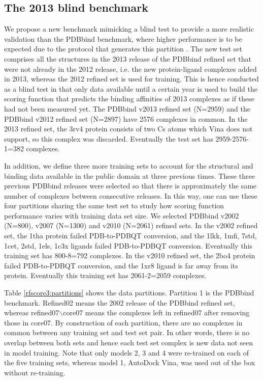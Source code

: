 \subsection{The 2013 blind benchmark}

We propose a new benchmark mimicking a blind test to provide a more realistic validation than the PDBbind benchmark, where higher performance is to be expected due to the protocol that generates this partition \citep{908}. The new test set comprises all the structures in the 2013 release of the PDBbind refined set that were not already in the 2012 release, i.e. the new protein-ligand complexes added in 2013, whereas the 2012 refined set is used for training. This is hence conducted as a blind test in that only data available until a certain year is used to build the scoring function that predicts the binding affinities of 2013 complexes as if these had not been measured yet. The PDBbind v2013 refined set (N=2959) and the PDBbind v2012 refined set (N=2897) have 2576 complexes in common. In the 2013 refined set, the 3rv4 protein consists of two Cs atoms which Vina does not support, so this complex was discarded. Eventually the test set has 2959-2576-1=382 complexes.

In addition, we define three more training sets to account for the structural and binding data available in the public domain at three previous times. These three previous PDBbind releases were selected so that there is approximately the same number of complexes between consecutive releases. In this way, one can use these four partitions sharing the same test set to study how scoring function performance varies with training data set size. We selected PDBbind v2002 (N=800), v2007 (N=1300) and v2010 (N=2061) refined sets. In the v2002 refined set, the 1tha protein failed PDB-to-PDBQT conversion, and the 1lkk, 1mfi, 7std, 1cet, 2std, 1els, 1c3x ligands failed PDB-to-PDBQT conversion. Eventually this training set has 800-8=792 complexes. In the v2010 refined set, the 2bo4 protein failed PDB-to-PDBQT conversion, and the 1xr8 ligand is far away from its protein. Eventually this training set has 2061-2=2059 complexes.

Table \ref{rfscore3:partitions} shows the data partitions. Partition 1 is the PDBbind benchmark. Refined02 means the 2002 release of the PDBbind refined set, whereas refined07$\backslash$core07 means the complexes left in refined07 after removing those in core07. By construction of each partition, there are no complexes in common between any training set and test set pair. In other words, there is no overlap between both sets and hence each test set complex is new data not seen in model training. Note that only models 2, 3 and 4 were re-trained on each of the five training sets, whereas model 1, AutoDock Vina, was used out of the box without re-training.

